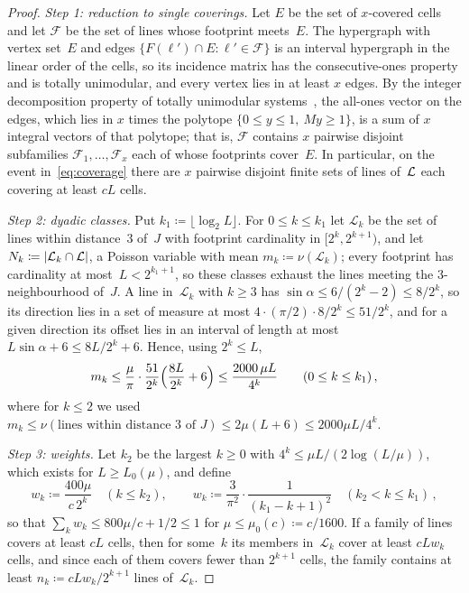 \documentclass[11pt,letterpaper]{article}
\begin{document}
\begin{proof}
\emph{Step 1: reduction to single coverings.} Let $E$ be the set of $x$-covered cells and let $\mathcal F$ be the set of lines whose footprint meets~$E$. The hypergraph with vertex set~$E$ and edges $\{F(\ell')\cap E\colon\ell'\in\mathcal F\}$ is an interval hypergraph in the linear order of the cells, so its incidence matrix has the consecutive-ones property and is totally unimodular, and every vertex lies in at least $x$ edges. By the integer decomposition property of totally unimodular systems~\cite{BT77}, the all-ones vector on the edges, which lies in $x$ times the polytope $\{0\le y\le1,\ My\ge1\}$, is a sum of $x$ integral vectors of that polytope; that is, $\mathcal F$ contains $x$ pairwise disjoint subfamilies $\mathcal F_1,\dots,\mathcal F_x$ each of whose footprints cover~$E$. In particular, on the event in~\eqref{eq:coverage} there are $x$ pairwise disjoint finite sets of lines of~$\mathcal L$ each covering at least $cL$ cells.

\emph{Step 2: dyadic classes.} Put $k_1\coloneqq\lfloor\log_2L\rfloor$. For $0\le k\le k_1$ let $\mathcal L_k$ be the set of lines within distance~$3$ of~$J$ with footprint cardinality in $[2^k,2^{k+1})$, and let $N_k\coloneqq\lvert\mathcal L_k\cap\mathcal L\rvert$, a Poisson variable with mean $m_k\coloneqq\nu(\mathcal L_k)$; every footprint has cardinality at most~$L<2^{k_1+1}$, so these classes exhaust the lines meeting the $3$-neighbourhood of~$J$. A line in~$\mathcal L_k$ with $k\ge3$ has $\sin\alpha\le6/(2^k-2)\le8/2^k$, so its direction lies in a set of measure at most $4\cdot(\pi/2)\cdot8/2^k\le51/2^k$, and for a given direction its offset lies in an interval of length at most $L\sin\alpha+6\le8L/2^k+6$. Hence, using $2^k\le L$,
\begin{equation}
\label{eq:mk}
  m_k\le\frac{\mu}{\pi}\cdot\frac{51}{2^k}\Bigl(\frac{8L}{2^k}+6\Bigr)\le\frac{2000\,\mu L}{4^k}\qquad(0\le k\le k_1)\,,
\end{equation}
where for $k\le2$ we used $m_k\le\nu(\text{lines within distance }3\text{ of }J)\le2\mu(L+6)\le2000\mu L/4^k$.

\emph{Step 3: weights.} Let $k_2$ be the largest $k\ge0$ with $4^k\le\mu L/(2\log(L/\mu))$, which exists for $L\ge L_0(\mu)$, and define
\begin{equation*}
  w_k\coloneqq\frac{400\mu}{c\,2^k}\quad(k\le k_2),\qquad w_k\coloneqq\frac{3}{\pi^2}\cdot\frac{1}{(k_1-k+1)^2}\quad(k_2<k\le k_1)\,,
\end{equation*}
so that $\sum_kw_k\le800\mu/c+1/2\le1$ for $\mu\le\mu_0(c)\coloneqq c/1600$. If a family of lines covers at least $cL$ cells, then for some~$k$ its members in~$\mathcal L_k$ cover at least $cLw_k$ cells, and since each of them covers fewer than $2^{k+1}$ cells, the family contains at least $n_k\coloneqq cLw_k/2^{k+1}$ lines of~$\mathcal L_k$.


\end{proof}
\end{document}
